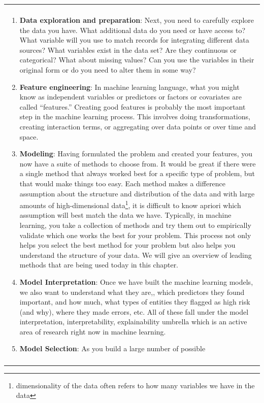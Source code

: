 \documentclass[]{krantz}
\newenvironment{F00}
    {\begin{center}
    \begin{tabular}{|p{0.9\textwidth}|}
    \hline\\
    }
    { 
    \\\\\hline
    \end{tabular} 
    \end{center}
    }
\begin{document}
\begin{F00}
\begin{enumerate}
\def\labelenumi{\arabic{enumi}.}
\setcounter{enumi}{2}
\item
  \textbf{Data exploration and preparation}: Next, you need to carefully
  explore the data you have. What additional data do you need or have
  access to? What variable will you use to match records for integrating
  different data sources? What variables exist in the data set? Are they
  continuous or categorical? What about missing values? Can you use the
  variables in their original form or do you need to alter them in some
  way?
\item
  \textbf{Feature engineering}: In machine learning language, what you
  might know as independent variables or predictors or factors or
  covariates are called ``features.'' Creating good features is probably
  the most important step in the machine learning process. This involves
  doing transformations, creating interaction terms, or aggregating over
  data points or over time and space.
\item
  \textbf{Modeling}: Having formulated the problem and created your
  features, you now have a suite of methods to choose from. It would be
  great if there were a single method that always worked best for a
  specific type of problem, but that would make things too easy. Each
  method makes a difference assumption about the structure and
  distribution of the data and with large amounts of high-dimensional
  data\footnote{dimensionality of the data often refers to how many
    variables we have in the data}, it is difficult to know apriori
  which assumption will best match the data we have. Typically, in
  machine learning, you take a collection of methods and try them out to
  empirically validate which one works the best for your problem. This
  process not only helps you select the best method for your problem but
  also helps you understand the structure of your data. We will give an
  overview of leading methods that are being used today in this chapter.
\item
  \textbf{Model Interpretation}: Once we have built the machine learning
  models, we also want to understand what they are,, which predictors
  they found important, and how much, what types of entities they
  flagged as high risk (and why), where they made errors, etc. All of
  these fall under the model interpretation, interpretability,
  explainability umbrella which is an active area of research right now
  in machine learning.
\item
  \textbf{Model Selection}: As you build a large number of possible

\end{enumerate}
\end{F00}
\end{document}
